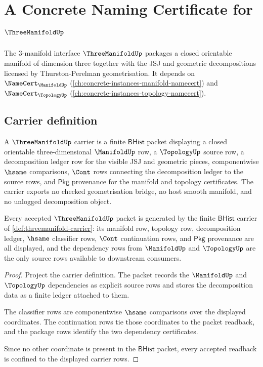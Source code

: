 \chapter{A Concrete Naming Certificate for $\ThreeManifoldUp$}
\label{ch:concrete-instances-threemanifold-namecert}

The 3-manifold interface $\ThreeManifoldUp$ packages a closed orientable manifold of dimension three together with the JSJ and geometric decompositions licensed by Thurston-Perelman geometrisation. It depends on $\NameCert_{\ManifoldUp}$ (\autoref{ch:concrete-instances-manifold-namecert}) and $\NameCert_{\TopologyUp}$ (\autoref{ch:concrete-instances-topology-namecert}).

\section{Carrier definition}
\label{sec:threemanifold-carrier}

\begin{definition}
\label{def:threemanifold-carrier}
A $\ThreeManifoldUp$ carrier is a finite $\mathsf{BHist}$ packet displaying a closed orientable three-dimensional $\ManifoldUp$ row, a $\TopologyUp$ source row, a decomposition ledger row for the visible JSJ and geometric pieces, componentwise $\hsame$ comparisons, $\Cont$ rows connecting the decomposition ledger to the source rows, and $\mathsf{Pkg}$ provenance for the manifold and topology certificates. The carrier exports no checked geometrisation bridge, no host smooth manifold, and no unlogged decomposition object.
\end{definition}

\begin{theorem}
\label{thm:threemanifold-carrier-obligation}
Every accepted $\ThreeManifoldUp$ packet is generated by the finite $\mathsf{BHist}$ carrier of \autoref{def:threemanifold-carrier}: its manifold row, topology row, decomposition ledger, $\hsame$ classifier rows, $\Cont$ continuation rows, and $\mathsf{Pkg}$ provenance are all displayed, and the dependency rows from $\ManifoldUp$ and $\TopologyUp$ are the only source rows available to downstream consumers.
\end{theorem}
\begin{proof}
Project the carrier definition. The packet records the $\ManifoldUp$ and $\TopologyUp$ dependencies as explicit source rows and stores the decomposition data as a finite ledger attached to them.

The classifier rows are componentwise $\hsame$ comparisons over the displayed coordinates. The continuation rows tie those coordinates to the packet readback, and the package rows identify the two dependency certificates.

Since no other coordinate is present in the $\mathsf{BHist}$ packet, every accepted readback is confined to the displayed carrier rows.
\end{proof}

